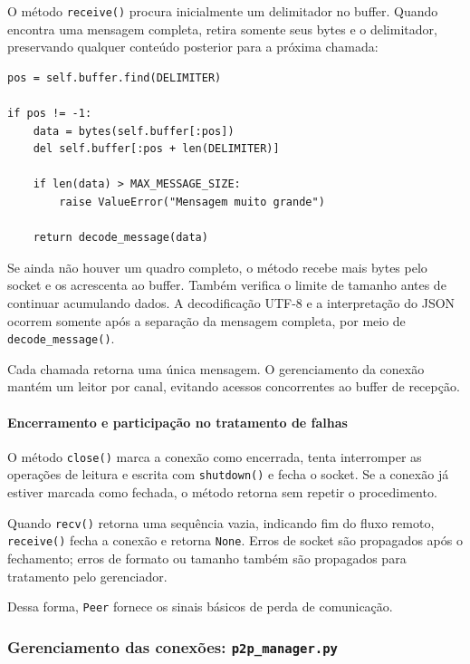 \documentclass[11pt,a4paper]{article}
\begin{document}
O método \texttt{receive()} procura inicialmente um delimitador no buffer. Quando encontra uma mensagem completa, retira somente seus bytes e o delimitador, preservando qualquer conteúdo posterior para a próxima chamada:

\par\smallskip
\noindent
\begin{minipage}{\linewidth}
\begin{verbatim}
pos = self.buffer.find(DELIMITER)

if pos != -1:
    data = bytes(self.buffer[:pos])
    del self.buffer[:pos + len(DELIMITER)]

    if len(data) > MAX_MESSAGE_SIZE:
        raise ValueError("Mensagem muito grande")

    return decode_message(data)
\end{verbatim}
\end{minipage}
\par\smallskip

Se ainda não houver um quadro completo, o método recebe mais bytes pelo socket e os acrescenta ao buffer. Também verifica o limite de tamanho antes de continuar acumulando dados. A decodificação UTF-8 e a interpretação do JSON ocorrem somente após a separação da mensagem completa, por meio de \texttt{decode\_message()}.

Cada chamada retorna uma única mensagem. O gerenciamento da conexão mantém um leitor por canal, evitando acessos concorrentes ao buffer de recepção.

\paragraph{Encerramento e participação no tratamento de falhas}

O método \texttt{close()} marca a conexão como encerrada, tenta interromper as operações de leitura e escrita com \texttt{shutdown()} e fecha o socket. Se a conexão já estiver marcada como fechada, o método retorna sem repetir o procedimento.

Quando \texttt{recv()} retorna uma sequência vazia, indicando fim do fluxo remoto, \texttt{receive()} fecha a conexão e retorna \texttt{None}. Erros de socket são propagados após o fechamento; erros de formato ou tamanho também são propagados para tratamento pelo gerenciador.

Dessa forma, \texttt{Peer} fornece os sinais básicos de perda de comunicação.

\subsubsection{Gerenciamento das conexões: \texttt{p2p\_manager.py}}
\label{sec:implementacao-manager}
\end{document}

